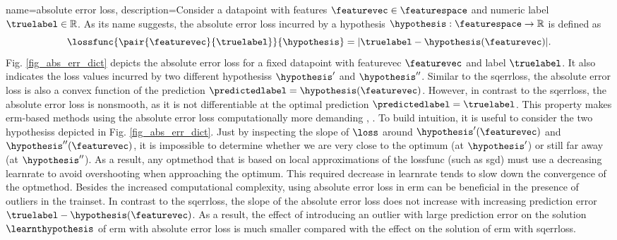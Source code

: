 {name={absolute error loss},
	description={Consider a \gls{datapoint} with \glspl{feature} $\featurevec \in \featurespace$ and numeric 
		\gls{label} $\truelabel \in \mathbb{R}$. As its name suggests, the absolute error \gls{loss} 
		incurred by a \gls{hypothesis} $\hypothesis: \featurespace \rightarrow \mathbb{R}$ 
		is defined as $$\lossfunc{\pair{\featurevec}{\truelabel}}{\hypothesis} = |\truelabel - \hypothesis(\featurevec)|.$$
		Fig. \ref{fig_abs_err_dict} depicts the absolute error \gls{loss} for a fixed \gls{datapoint} 
		with \gls{featurevec} $\featurevec$ and \gls{label} $\truelabel$. It also indicates the \gls{loss} values 
		incurred by two different \glspl{hypothesis} $\hypothesis'$ and $\hypothesis''$. Similar to the \gls{sqerrloss}, 
		the absolute error \gls{loss} is also a \gls{convex} \gls{function} of the \gls{prediction} $\predictedlabel=\hypothesis(\featurevec)$. 
		However, in contrast to the \gls{sqerrloss}, the absolute error \gls{loss} is \gls{nonsmooth}, as it is not 
		\gls{differentiable} at the optimal \gls{prediction} $\predictedlabel=\truelabel$. This property 
		makes \gls{erm}-based methods using the absolute error \gls{loss} computationally more demanding \cite{nesterov04}, \cite{OptMLBook}. 
	    	To build intuition, it is useful to consider the two \glspl{hypothesis} depicted in Fig. \ref{fig_abs_err_dict}. 
	    	Just by inspecting the slope of $\loss$ around $\hypothesis'(\featurevec)$ and $\hypothesis''(\featurevec)$,
	     	it is impossible to determine whether we are very close to the optimum (at $\hypothesis'$) or still far away (at $\hypothesis''$). 
	     	As a result, any \gls{optmethod} that is based on local approximations of the \gls{lossfunc} (such as \gls{sgd}) 
	     	must use a decreasing \gls{learnrate} to avoid overshooting when approaching the optimum. This required 
	     	decrease in \gls{learnrate} tends to slow down the \gls{convergence} of the 
	     	\gls{optmethod}. Besides the increased computational complexity, using absolute error \gls{loss} in \gls{erm} can 
	     	be beneficial in the presence of \glspl{outlier} in the \gls{trainset}. In contrast to the \gls{sqerrloss}, 
	     	the slope of the absolute error \gls{loss} does not increase with increasing \gls{prediction} error 
	     	$\truelabel - \hypothesis(\featurevec)$. As a result, the effect of introducing an \gls{outlier} with 
	     	large \gls{prediction} error on the solution $\learnthypothesis$ of \gls{erm} with absolute error \gls{loss} 
	     	is much smaller compared with the effect on the solution of \gls{erm} with \gls{sqerrloss}. 
}}
